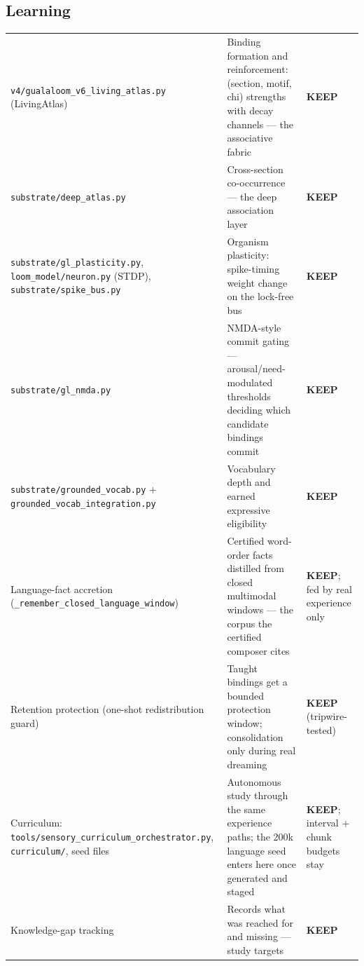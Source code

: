 \documentclass[11pt]{article}
\newcommand{\keep}{\textbf{KEEP}}
\begin{document}
\subsection{Learning}
\begin{longtable}{p{} p{} p{}}
\toprule
\texttt{v4/gualaloom\_v6\_living\_atlas.py} (LivingAtlas) &
Binding formation and reinforcement: (section, motif, chi) strengths with
decay channels — the associative fabric &
\keep{} \\
\texttt{substrate/deep\_atlas.py} &
Cross-section co-occurrence — the deep association layer &
\keep{} \\
\texttt{substrate/gl\_plasticity.py}, \texttt{loom\_model/neuron.py}
(STDP), \texttt{substrate/spike\_bus.py} &
Organism plasticity: spike-timing weight change on the lock-free bus &
\keep{} \\
\texttt{substrate/gl\_nmda.py} &
NMDA-style commit gating — arousal/need-modulated thresholds deciding
which candidate bindings commit &
\keep{} \\
\texttt{substrate/grounded\_vocab.py} +
\texttt{grounded\_vocab\_integration.py} &
Vocabulary depth and earned expressive eligibility &
\keep{} \\
Language-fact accretion (\texttt{\_remember\_closed\_language\_window}) &
Certified word-order facts distilled from closed multimodal windows — the
corpus the certified composer cites &
\keep{}; fed by real experience only \\
Retention protection (one-shot redistribution guard) &
Taught bindings get a bounded protection window; consolidation only during
real dreaming &
\keep{} (tripwire-tested) \\
Curriculum: \texttt{tools/sensory\_curriculum\_orchestrator.py},
\texttt{curriculum/}, seed files &
Autonomous study through the same experience paths; the 200k language seed
enters here once generated and staged &
\keep{}; interval + chunk budgets stay \\
Knowledge-gap tracking &
Records what was reached for and missing — study targets &
\keep{} \\
\bottomrule
\end{longtable}
\end{document}
